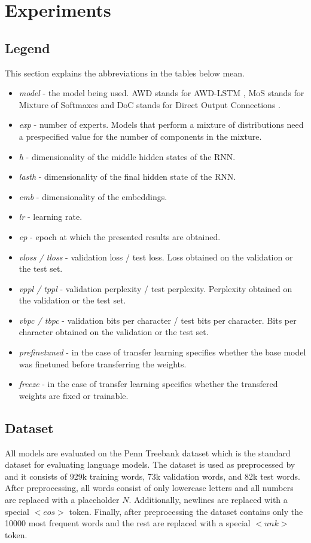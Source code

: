 \chapter{Experiments}

\section{Legend}
This section explains the abbreviations in the tables below mean.

\begin{itemize}
    \item \emph{model} - the model being used. AWD stands for AWD-LSTM \citep{merity2017regularizing}, MoS \citep{yang2017breaking} stands for Mixture of Softmaxes and DoC stands for Direct Output Connections \citep{takase2018direct}.
    \item \emph{exp} - number of experts. Models that perform a mixture of distributions need a prespecified value for the number of components in the mixture.
    \item \emph{h} - dimensionality of the middle hidden states of the RNN.
    \item \emph{lasth} - dimensionality of the final hidden state of the RNN.
    \item \emph{emb} - dimensionality of the embeddings.
    \item \emph{lr} - learning rate.
    \item \emph{ep} - epoch at which the presented results are obtained.
    \item \emph{vloss / tloss} - validation loss / test loss. Loss obtained on the validation or the test set.
    \item \emph{vppl / tppl} - validation perplexity / test perplexity. Perplexity obtained on the validation or the test set.
    \item \emph{vbpc / tbpc} - validation bits per character / test bits per character. Bits per character obtained on the validation or the test set.
    \item \emph{prefinetuned} - in the case of transfer learning specifies whether the base model was finetuned before transferring the weights.
    \item \emph{freeze} - in the case of transfer learning specifies whether the transfered weights are fixed or trainable.
\end{itemize}

\section{Dataset}
All models are evaluated on the Penn Treebank dataset which is the standard dataset for evaluating language models. The dataset is used as preprocessed by \citet{mikolov2011empirical} and it consists of 929k training words, 73k validation words, and 82k test words. After preprocessing, all words consist of only lowercase letters and all numbers are replaced with a placeholder $ N $. Additionally, newlines are replaced with a special $ <eos> $ token. Finally, after preprocessing the dataset contains only the 10000 most frequent words and the rest are replaced with a special $ <unk> $ token.

